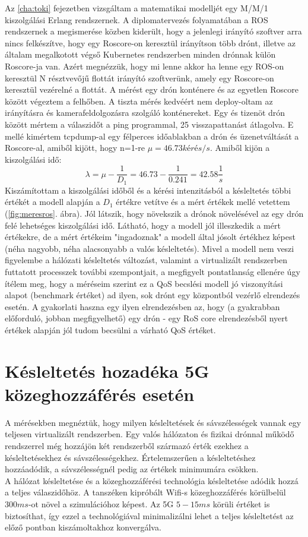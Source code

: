 \noindent
Az \ref{cha:toki} fejezetben vizsgáltam a matematikai modelljét egy M/M/1 kiszolgálási Erlang rendszernek. A diplomatervezés folyamatában a ROS rendszernek a megismerése közben kiderült, hogy a jelenlegi irányító szoftver arra nincs felkészítve, hogy egy Roscore-on keresztül irányítson több drónt, illetve az általam megalkotott végső Kubernetes rendszerben minden drónnak külön Roscore-ja van. Azért megnézzük, hogy mi lenne akkor ha lenne egy ROS-on keresztül N résztvevőjű flottát irányító szoftverünk, amely egy Roscore-on keresztül vezérelné a flottát. A mérést egy drón konténere és az egyetlen Roscore között végeztem a felhőben. A tiszta mérés kedvéért nem deploy-oltam az irányításra és kamerafeldolgozásra szolgáló konténereket. Egy és tizenöt drón között mértem a válaszidőt a ping programmal, 25 visszapattanást átlagolva.  E mellé kimértem tcpdump-al egy félperces időablakban a drón és üzenetváltását a Roscore-al, amiből kijött, hogy n=1-re $\mu = 46.73 kérés/s$. Amiből kijön a kiszolgálási idő: \begin{equation}\lambda= \mu-\frac{1}{D_1} = 46.73-\frac{1}{0.241} = 42.58 \frac{1}{s} \end{equation} Kiszámítottam a kiszolgálási időből és a kérési intenzitásból a késleltetés többi értékét a modell alapján a $D_1$ értékre vetítve és a mért értékek mellé vetettem (\ref{fig:meresros}. ábra). Jól látszik, hogy növekszik a drónok növelésével az egy drón felé lehetséges kiszolgálási idő. Látható, hogy a modell jól illeszkedik a mért értékekre, de a mért értékeim "ingadoznak" a modell által jósolt értékhez képest (néha nagyobb, néha alacsonyabb a valós késleltetés). Mivel a modell nem veszi figyelembe a hálózati késleltetés változást, valamint a virtualizált rendszerben futtatott processzek további szempontjait, a megfigyelt pontatlanság ellenére úgy ítélem meg, hogy a méréseim szerint ez a QoS becslési modell jó viszonyítási alapot (benchmark értéket) ad ilyen, sok drónt egy központból vezérlő elrendezés esetén. A gyakorlati haszna egy ilyen elrendezésben az, hogy (a gyakrabban előforduló, jobban megfigyelhető) egy drón - egy RoS core elrendezésből nyert értékek alapján jól tudom becsülni a várható QoS értéket.

\section{Késleltetés hozadéka 5G közeghozzáférés esetén}
A mérésekben megnéztük, hogy milyen késleltetések és sávszélességek vannak egy teljesen virtualizált rendszerben. Egy valós hálózaton és fizikai drónnal működő rendszerrel még hozzájön két rendszerből származó érték ezekhez a késleltetésekhez és sávszélességekhez. Értelemszerűen a késleltetéshez hozzáadódik, a sávszélességnél pedig az értékek minimumára csökken. \\

\noindent
A hálózat késleltetése és a közeghozzáférési technológia késleltetése adódik hozzá a teljes válaszidőhöz. A tanszéken kipróbált Wifi-s közeghozzáférés körülbelül $300 ms$-ot növel a szimulációhoz képest. Az 5G $5-15 ms$ körüli értéket is biztosíthat, így ezzel a technológiával minimalizálni lehet a teljes késleltetést az előző pontban kiszámoltakhoz konvergálva.